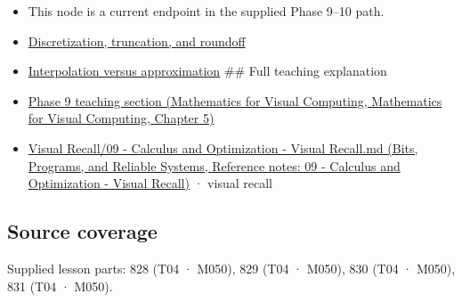 \begin{itemize}
\item
  This node is a current endpoint in the supplied Phase 9--10 path.
\item
  \hyperref[appendix-6b0648b2b8e8]{Discretization, truncation, and roundoff}
\item
  \hyperref[appendix-0c2a5f69851e]{Interpolation versus approximation} \#\# Full teaching explanation
\item
  \href{../02-Mathematics-for-Visual-Computing/main.pdf\#nameddest=02-foundations-ii-ch021-jacobians-curvature-and-local-approximation}{Phase 9 teaching section (Mathematics for Visual Computing, Mathematics for Visual Computing, Chapter 5)}
\item
  \href{../01-Bits-Programs-and-Reliable-Systems/main.pdf\#nameddest=appendix-adf48f5dc5c1}{Visual Recall/09 - Calculus and Optimization - Visual Recall.md (Bits, Programs, and Reliable Systems, Reference notes: 09 - Calculus and Optimization - Visual Recall)} · visual recall
\end{itemize}

\subsection{Source coverage}\label{appendix-32f39e9a3738-source-coverage}

Supplied lesson parts: 828 (T04 · M050), 829 (T04 · M050), 830 (T04 · M050), 831 (T04 · M050).
